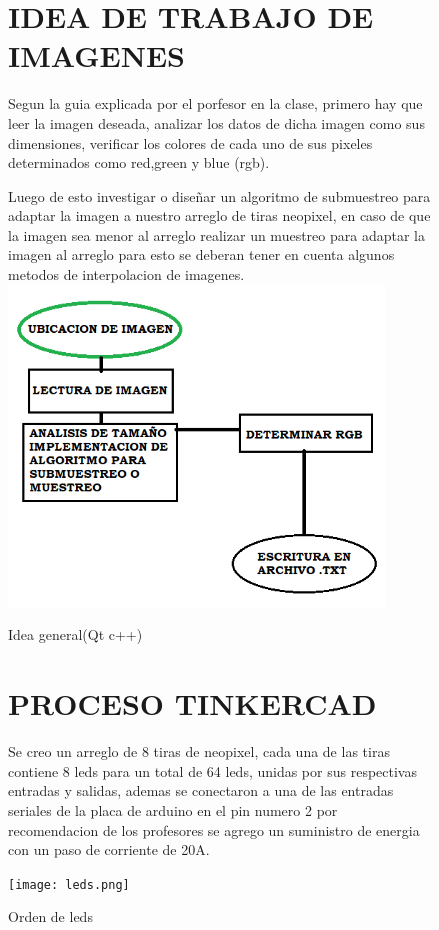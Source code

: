 \documentclass{article}
\begin{document}
\begin{figure}
\section{IDEA DE TRABAJO DE IMAGENES}
Segun la guia explicada por el porfesor en la clase, primero hay que leer la imagen deseada, analizar los datos de dicha imagen como sus dimensiones, verificar los colores de cada uno de sus pixeles determinados como red,green y blue (rgb).

Luego de esto investigar o diseñar un algoritmo de submuestreo para adaptar la imagen a nuestro arreglo de tiras neopixel, en caso de que la imagen sea menor al arreglo realizar un muestreo para adaptar la imagen al arreglo para esto se deberan tener en cuenta algunos metodos de interpolacion de imagenes.\\
    \includegraphics[width=10cm]{diagrama2.png}
    \centering
    \caption{Idea general(Qt c++)}
    \label{fig:diagrama2}
    \end{figure}

\begin{figure}   
\section{PROCESO TINKERCAD}
Se creo un arreglo de 8 tiras de neopixel, cada una de las tiras contiene 8 leds para un total de 64 leds, unidas por sus respectivas entradas y salidas, ademas se conectaron a una de las entradas seriales de la placa de arduino en el pin numero 2 por recomendacion de los profesores se agrego un suministro de energia con un paso de corriente de 20A.

    \texttt{[image: leds.png]}
    \centering
    \caption{Orden de leds}
    \label{fig:leds}
    \end{figure}
\end{document}
